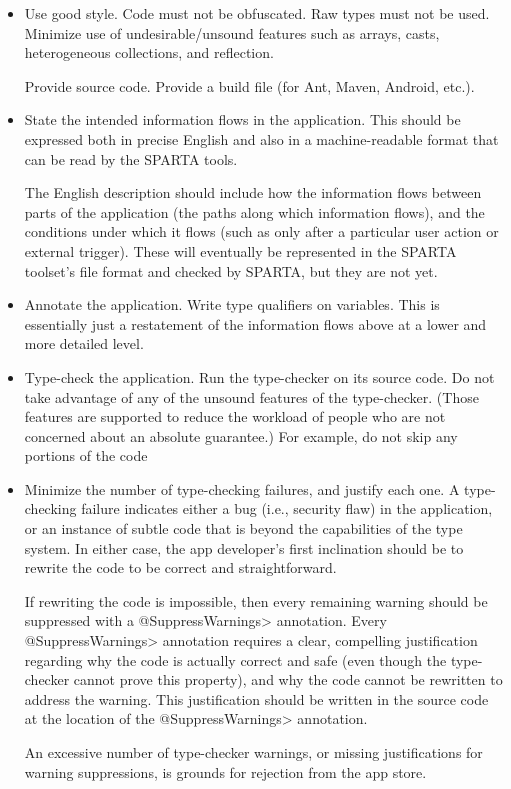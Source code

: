 \begin{itemize}
\item
  Use good style.  Code must not be obfuscated.  Raw types must not be
  used.  Minimize use of undesirable/unsound features such as arrays,
  casts, heterogeneous collections, and reflection.

  Provide source code.  Provide a build file (for Ant, Maven, Android,
  etc.).

\item
  State the intended information flows in the application.  This should
  be expressed both in precise English and also in a machine-readable
  format that can be read by the SPARTA tools.

  The English description should include how the information flows between
  parts of the application (the paths along which information flows), and
  the conditions under which it flows (such as only after a particular user
  action or external trigger).  These will eventually be represented in the
  SPARTA toolset's file format and checked by SPARTA, but they are not yet.

\item
  Annotate the application.  Write type qualifiers on variables.  This is
  essentially just a restatement of the information flows above at a lower
  and more detailed level.

\item
  Type-check the application.  Run the type-checker on its source code.  Do
  not take advantage of any of the unsound features of the type-checker.
  (Those features are supported to reduce the workload of people who are
  not concerned about an absolute guarantee.)  For example, do not skip any
  portions of the code

\item
  Minimize the number of type-checking failures, and justify each one.  A
  type-checking failure indicates either a bug (i.e., security flaw) in the
  application, or an instance of subtle code that is beyond the
  capabilities of the type system.  In either case, the app developer's
  first inclination should be to rewrite the code to be correct and
  straightforward.

  If rewriting the code is impossible, then every remaining warning should
  be suppressed with a \<@SuppressWarnings> annotation.  Every
  \<@SuppressWarnings> annotation requires a clear, compelling
  justification regarding why the code is actually correct and safe (even
  though the type-checker cannot prove this property), and why the code
  cannot be rewritten to address the warning.  This justification should be
  written in the source code at the location of the \<@SuppressWarnings>
  annotation.

  An excessive number of type-checker warnings, or missing justifications
  for warning suppressions, is grounds for rejection from the app store.

\end{itemize}




